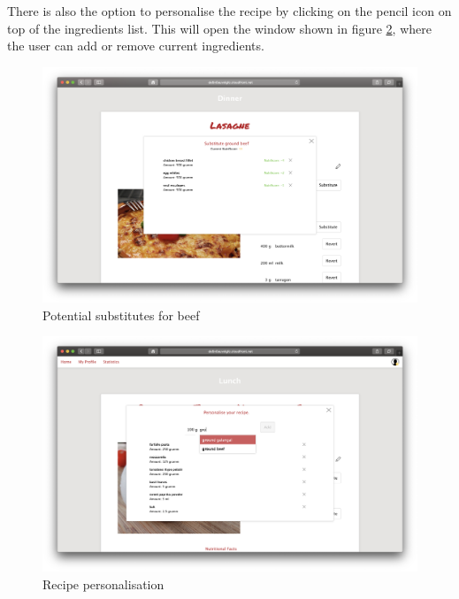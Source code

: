 There is also the option to personalise the recipe by clicking on the pencil icon on top of the ingredients list. This will open the window shown in figure \ref{fig:personalisation}, where the user can add or remove current ingredients.

\vspace{-1em}
\begin{figure}[H]
	\captionsetup{justification=centering}
	\begin{center}
		\includegraphics[scale=0.28]{Ressourcen/img/screenshots/screenshotJ.png}
		\vspace{-3em}
		\caption{Potential substitutes for beef}
		\label{fig:substitute}
	\end{center}
\end{figure}

\vspace{-2em}
\begin{figure}[H]
	\captionsetup{justification=centering}
	\begin{center}
		\includegraphics[scale=0.28]{Ressourcen/img/screenshots/screenshotK.png}
		\vspace{-3em}
		\caption{Recipe personalisation}
		\label{fig:personalisation}
	\end{center}
\end{figure}

